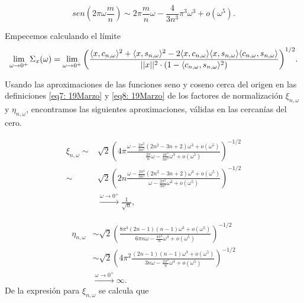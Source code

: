 \[
sen\left(
2 \pi \omega \frac{m}{n}\right) \sim
2 \pi \frac{m}{n} \omega 
- \frac{4}{3n^{3}}\pi^{3} \omega^{3}
+ o(\omega^{5}).
\]

Empecemos calculando 
el límite
\begin{equation}
\label{eq0: 22May}
\lim\limits_{\omega \rightarrow 0^{+}}{
\Sigma_{x}(\omega)}
= \lim\limits_{\omega \rightarrow 0^{+}}{
\left(		  
		  \frac{\langle x, c_{n, \omega } \rangle^{2} +  \langle x, s_{n, \omega } \rangle^{2}	
	       -2  \langle x, c_{n, \omega } \rangle \langle x, s_{n, \omega } \rangle \langle c_{n, \omega }, s_{n, \omega } \rangle}{ || x ||^{2} \cdot
	       (1- \langle c_{n, \omega }, s_{n, \omega } \rangle^{2})}	  
\right) ^{1/2}
}.
\end{equation}


Usando las aproximaciones de las funciones seno y coseno
cerca del origen en 
las definiciones
\eqref{eq7: 19Marzo} y \eqref{eq8: 19Marzo}
de los factores de normalización
$\xi_{n, \omega}$ y $\eta_{n, \omega}$,
encontramos las siguientes aproximaciones,
válidas en las cercanías del cero.
 
\begin{align*}
\xi_{n, \omega} \sim &
\sqrt{2} 
\left(
4 \pi
\frac{                                                                                                                                          
\omega - \frac{2\pi^{2}}{3n^{2}}(2n^2-3n+2)\omega^{3} + o(\omega^{5})
}{
\frac{2\pi}{n} \omega -
\frac{4 \pi^{3}}{3 n^{3}} \omega^{3} + o(\omega^{5})
}
\right)^{-1/2} \\
\sim &
\sqrt{2} 
\left(
2n
\frac{                                                                                                                                          
\omega - \frac{2\pi^{2}}{3n^{2}}(2n^2-3n+2)\omega^{3} + o(\omega^{5})
}{
\omega -
\frac{2 \pi^{2}}{3 n^{2}} \omega^{3} + o(\omega^{5})
}
\right)^{-1/2} \\ &
\xrightarrow{\omega \rightarrow 0^{+}} 
\frac{1}{\sqrt{n}},
\end{align*}

\begin{align*}
\eta_{n, \omega} & \sim 
\sqrt{2} 
\left(
\frac{
8 \pi^{3} (2n-1)(n-1)\omega^{3} + o(\omega^{5})
}{
6 \pi n \omega -
\frac{4 \pi^{3}}{n} \omega^{3} + o(\omega^{5})
}
\right)^{-1/2} \\
& \sim 
\sqrt{2} 
\left(
4\pi^{2}
\frac{
(2n-1)(n-1)\omega^{3} + o(\omega^{5})
}{
3 n \omega -
\frac{2 \pi^{2}}{n} \omega^{3} + o(\omega^{5})
}
\right)^{-1/2}  \\  &
\xrightarrow{\omega \rightarrow 0^{+}} 
\infty.
\end{align*}
De la expresión para $\xi_{n, \omega}$ se calcula que

